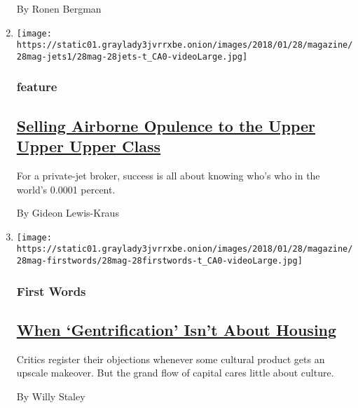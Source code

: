 \begin{enumerate}
  By Ronen Bergman
\item
  \texttt{[image: https://static01.graylady3jvrrxbe.onion/images/2018/01/28/magazine/28mag-jets1/28mag-28jets-t\_CA0-videoLarge.jpg]}

  \hypertarget{feature-2}{%
  \subsubsection{feature}\label{feature-2}}

  \hypertarget{selling-airborne-opulence-to-the-upper-upper-upper-class}{%
  \subsection{\texorpdfstring{\href{/2018/01/23/magazine/selling-airborne-opulence-to-the-upper-upper-upper-class.html}{Selling
  Airborne Opulence to the Upper Upper Upper
  Class}}{Selling Airborne Opulence to the Upper Upper Upper Class}}\label{selling-airborne-opulence-to-the-upper-upper-upper-class}}

  For a private-jet broker, success is all about knowing who's who in
  the world's 0.0001 percent.

  By Gideon Lewis-Kraus
\item
  \texttt{[image: https://static01.graylady3jvrrxbe.onion/images/2018/01/28/magazine/28mag-firstwords/28mag-28firstwords-t\_CA0-videoLarge.jpg]}

  \hypertarget{first-words}{%
  \subsubsection{First Words}\label{first-words}}

  \hypertarget{when-gentrification-isnt-about-housing}{%
  \subsection{\texorpdfstring{\href{/2018/01/23/magazine/when-gentrification-isnt-about-housing.html}{When
  `Gentrification' Isn't About
  Housing}}{When `Gentrification' Isn't About Housing}}\label{when-gentrification-isnt-about-housing}}

  Critics register their objections whenever some cultural product gets
  an upscale makeover. But the grand flow of capital cares little about
  culture.

  By Willy Staley
\end{enumerate}

